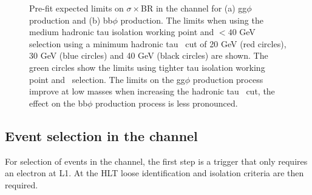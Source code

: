 \begin{figure}[h!]
\begin{center}
\end{center}
\caption{Pre-fit expected limits on $\sigma\times$BR in the \mutau channel for (a) gg$\phi$ production and (b) bb$\phi$ production. The
limits when using the medium hadronic tau isolation working point and \mT$<40$ GeV selection using a minimum
hadronic tau \pT~cut of 20 GeV (red circles), 30 GeV (blue circles) and 40 GeV (black circles) are shown. The green
circles show the limits using tighter tau isolation working point and \mT~selection. The limits on
the gg$\phi$ production process improve at low masses when increasing the hadronic tau \pT~cut,
the effect on the bb$\phi$ production process is less pronounced.}
\label{fig:mssm_tauptcut}
\end{figure}


\subsection{\texorpdfstring{Event selection in the \etau channel}{Event selection in the e tau channel}}
\label{sec:mssm_eventsel_et}
For selection of events in the \etau channel, the first step is
a trigger that only requires an electron at \ac{L1}. At the \ac{HLT}
loose identification and isolation criteria are then required.

